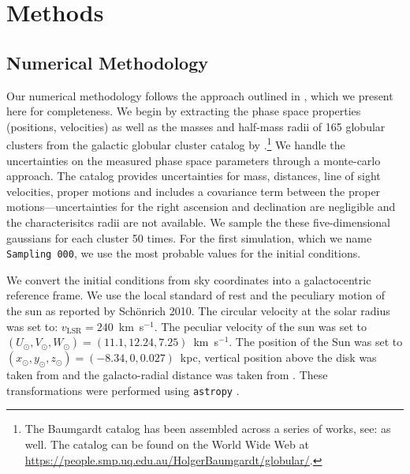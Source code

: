 \documentclass{aa}
\begin{document}
    


\section{Methods}

  \subsection{Numerical Methodology}
    Our numerical methodology follows the approach outlined in \citet{2023A&A...673A..44F}, which we present here for completeness. We begin by extracting the phase space properties (positions, velocities) as well as the masses and half-mass radii of 165 globular clusters from the galactic globular cluster catalog by \cite{2021MNRAS.505.5957B}.\footnote{The Baumgardt catalog has been assembled across a series of works, see: \cite{2020PASA...37...46B,2019MNRAS.482.5138B,2018MNRAS.478.1520B} as well. The catalog can be found on the World Wide Web at \href{https://people.smp.uq.edu.au/HolgerBaumgardt/globular/}{https://people.smp.uq.edu.au/HolgerBaumgardt/globular/}.} We handle the uncertainties on the measured phase space parameters through a monte-carlo approach. The catalog provides uncertainties for mass, distances, line of sight velocities, proper motions and includes a covariance term between the proper motions---uncertainties for the right ascension and declination are negligible and the characterisitcs radii are not available. We sample the these five-dimensional gaussians for each cluster 50 times. For the first simulation, which we name \texttt{Sampling 000}, we use the most probable values for the initial conditions. 
    
    We convert the initial conditions from sky coordinates into a galactocentric reference frame. We use the local standard of rest and the peculiary motion of the sun as reported by Sch\"onrich 2010. The circular velocity at the solar radius was set to: $v_{\text{LSR}} = 240$~km~s$^{-1}$. The peculiar velocity of the sun was set to $(U_\odot, V_\odot, W_\odot)=(11.1, 12.24, 7.25)$~km~s$^{-1}$. The position of the Sun was set to $(x_\odot,y_\odot,z_\odot) = (-8.34,0,0.027)$~kpc, vertical position above the disk was taken from \citet{2001ApJ...553..184C} and the galacto-radial distance was taken from \citet{2004ApJ...616..872R}. These transformations were performed using \texttt{astropy} \citep{2013A&A...558A..33A}.
\end{document}
